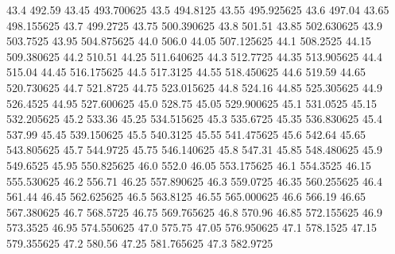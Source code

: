            43.4           492.59
          43.45       493.700625
           43.5         494.8125
          43.55       495.925625
           43.6           497.04
          43.65       498.155625
           43.7         499.2725
          43.75       500.390625
           43.8           501.51
          43.85       502.630625
           43.9         503.7525
          43.95       504.875625
           44.0            506.0
          44.05       507.125625
           44.1         508.2525
          44.15       509.380625
           44.2           510.51
          44.25       511.640625
           44.3         512.7725
          44.35       513.905625
           44.4           515.04
          44.45       516.175625
           44.5         517.3125
          44.55       518.450625
           44.6           519.59
          44.65       520.730625
           44.7         521.8725
          44.75       523.015625
           44.8           524.16
          44.85       525.305625
           44.9         526.4525
          44.95       527.600625
           45.0           528.75
          45.05       529.900625
           45.1         531.0525
          45.15       532.205625
           45.2           533.36
          45.25       534.515625
           45.3         535.6725
          45.35       536.830625
           45.4           537.99
          45.45       539.150625
           45.5         540.3125
          45.55       541.475625
           45.6           542.64
          45.65       543.805625
           45.7         544.9725
          45.75       546.140625
           45.8           547.31
          45.85       548.480625
           45.9         549.6525
          45.95       550.825625
           46.0            552.0
          46.05       553.175625
           46.1         554.3525
          46.15       555.530625
           46.2           556.71
          46.25       557.890625
           46.3         559.0725
          46.35       560.255625
           46.4           561.44
          46.45       562.625625
           46.5         563.8125
          46.55       565.000625
           46.6           566.19
          46.65       567.380625
           46.7         568.5725
          46.75       569.765625
           46.8           570.96
          46.85       572.155625
           46.9         573.3525
          46.95       574.550625
           47.0           575.75
          47.05       576.950625
           47.1         578.1525
          47.15       579.355625
           47.2           580.56
          47.25       581.765625
           47.3         582.9725
